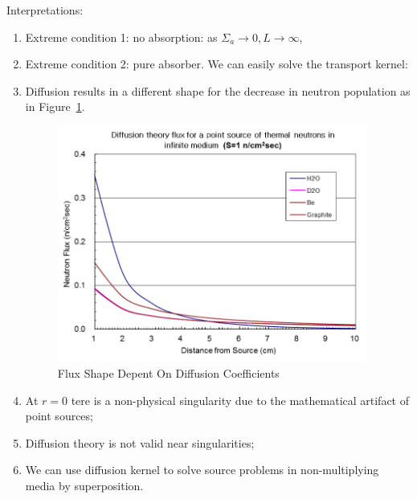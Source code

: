 \documentclass{school-22.211-notes}
\begin{document}
Interpretations:
\begin{enumerate}
\item Extreme condition 1: no absorption: as $\Sigma_a \to 0, L\to \infty$, 
\item Extreme condition 2: pure absorber. We can easily solve the transport kernel: 
\item Diffusion results in a different shape for the decrease in neutron population as in Figure~\ref{dfs-shape}.
  \begin{figure}
    \centering
    \includegraphics[width=4in]{images/dfs/dfs-shape.png}
    \caption{Flux Shape Depent On Diffusion Coefficients}\label{dfs-shape}
  \end{figure}
\item At $r=0$ tere is a non-physical singularity due to the mathematical artifact of point sources;
\item Diffusion theory is not valid near singularities;
\item We can use diffusion kernel to solve source problems in non-multiplying media by superposition.
\end{enumerate}
\end{document}

